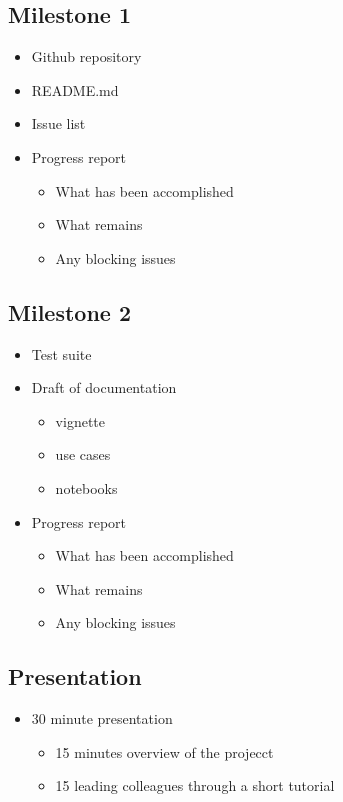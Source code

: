 \documentclass[12pt]{article}
\begin{document}
\subsection*{Milestone 1}
\label{sec:orgde66c13}
\begin{itemize}
\item Github repository
\item README.md
\item Issue list
\item Progress report
\begin{itemize}
\item What has been accomplished
\item What remains
\item Any blocking issues
\end{itemize}
\end{itemize}
\subsection*{Milestone 2}
\label{sec:orgb0446bc}
\begin{itemize}
\item Test suite
\item Draft of documentation
\begin{itemize}
\item vignette
\item use cases
\item notebooks
\end{itemize}
\item Progress report
\begin{itemize}
\item What has been accomplished
\item What remains
\item Any blocking issues
\end{itemize}
\end{itemize}
\subsection*{Presentation}
\label{sec:org5449d97}
\begin{itemize}
\item 30 minute presentation
\begin{itemize}
\item 15 minutes overview of the projecct
\item 15 leading colleagues through a short tutorial
\end{itemize}
\end{itemize}
\end{document}
